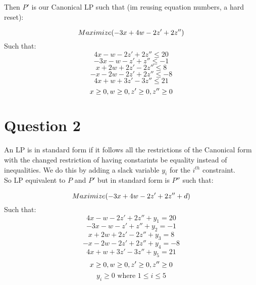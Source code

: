 \documentclass{article}
\numberwithin{equation}{subsection}
\begin{document}
	\newpage
	Then $P'$ is our Canonical LP such that (im reusing equation numbers, a hard reset):

	\begin{equation}\notag
		Maximize(-3x+4w-2z'+2z'')
	\end{equation}
	Such that:
	\begin{equation}\tag{1}
		4x-w-2z'+2z''\leq20	
	\end{equation}
	\begin{equation}\tag{2}
		-3x-w-z'+z''\leq-1	
	\end{equation}
	\begin{equation}\tag{3}
		x+2w+2z'-2z''\leq8
	\end{equation}
	\begin{equation}\tag{4}
		-x-2w-2z'+2z''\leq-8	
	\end{equation}
	\begin{equation}\tag{5}
		4x+w+3z'-3z''\leq21	
	\end{equation}
	\begin{equation}\notag
		x\ge0, w\ge0, z'\ge0, z''\ge0	
	\end{equation}


	\newpage 
	\section{Question 2}
	\par{
		An LP is in standard form if it follows all the restrictions of the Canonical form
		with the changed restriction of having constarints be equality instead of inequalities.
		We do this by adding a slack variable $y_i$ for the $i^{th}$ constraint.\\ 
		So LP equivalent to $P$ and $P'$ but in standard form is $P''$ such that:
	}

	\begin{equation}\notag
		Maximize(-3x+4w-2z'+2z'' +d)
	\end{equation}
	Such that:
	\begin{equation}\tag{1}
		4x-w-2z'+2z''+y_1=20	
	\end{equation}
	\begin{equation}\tag{2}
		-3x-w-z'+z''+y_2=-1	
	\end{equation}
	\begin{equation}\tag{3}
		x+2w+2z'-2z''+y_3=8
	\end{equation}
	\begin{equation}\tag{4}
		-x-2w-2z'+2z''+y_4=-8	
	\end{equation}
	\begin{equation}\tag{5}
		4x+w+3z'-3z''+y_5=21	
	\end{equation}
	\begin{equation}\notag
		x\ge0, w\ge0, z'\ge0, z''\ge0
	\end{equation}
	\begin{equation}
		y_i\ge0 \text{ where } 1\le i\le5	
	\end{equation}
\end{document}
